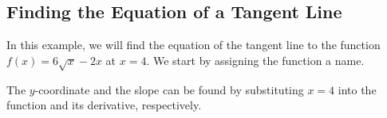 \subsection{Finding the Equation of a Tangent Line}
\label{subsec:equation_of_tangent_line}

In this example, we will find the equation of the tangent line to the function $f(x)=6\sqrt{x} - 2x$ at $x=4$. We start by assigning the function a name.

\begin{maplegroup}
\begin{mapleinput}
\end{mapleinput}
\mapleresult
\begin{maplelatex}
\end{maplelatex}
\end{maplegroup}

\begin{maplegroup}
\begin{mapleinput}
\end{mapleinput}
\mapleresult
\begin{maplelatex}
\end{maplelatex}
\end{maplegroup}

The $y$-coordinate and the slope can be found by substituting $x=4$ into the function and its derivative, respectively.

\begin{maplegroup}
\begin{mapleinput}
\end{mapleinput}
\mapleresult
\begin{maplelatex}
\end{maplelatex}
\end{maplegroup}

